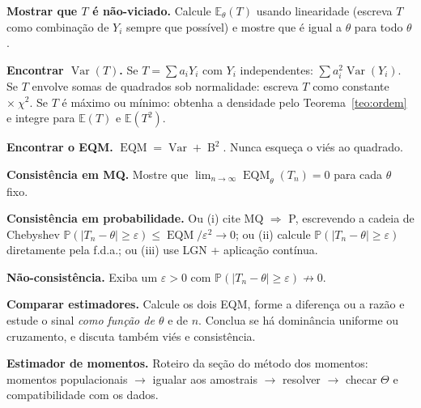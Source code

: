 \documentclass[11pt,a4paper]{article}
\theoremstyle{definition}
\theoremstyle{plain}
\newcommand{\E}{\mathbb{E}}
\newcommand{\Var}{\operatorname{Var}}
\newcommand{\EQM}{\operatorname{EQM}}
\newcommand{\B}{\operatorname{B}}
\newcommand{\Prob}{\mathbb{P}}
\begin{document}
\begin{mdframed}[linecolor=Gray,backgroundcolor=Gray!5]
\textbf{Mostrar que $T$ é não-viciado.}
Calcule $\E_\theta(T)$ usando linearidade (escreva $T$ como combinação de $Y_i$ sempre que possível) e mostre que é igual a $\theta$ para todo $\theta$.

\medskip
\textbf{Encontrar $\Var(T)$.}
Se $T=\sum a_iY_i$ com $Y_i$ independentes: $\sum a_i^2\Var(Y_i)$. Se $T$ envolve somas de quadrados sob normalidade: escreva $T$ como constante $\times\ \chi^2$. Se $T$ é máximo ou mínimo: obtenha a densidade pelo Teorema~\ref{teo:ordem} e integre para $\E(T)$ e $\E(T^2)$.

\medskip
\textbf{Encontrar o EQM.}
$\EQM=\Var+\B^2$. Nunca esqueça o viés ao quadrado.

\medskip
\textbf{Consistência em MQ.}
Mostre que $\lim_{n\to\infty}\EQM_\theta(T_n)=0$ para cada $\theta$ fixo.

\medskip
\textbf{Consistência em probabilidade.}
Ou (i) cite MQ $\Rightarrow$ P, escrevendo a cadeia de Chebyshev
$\Prob(|T_n-\theta|\ge\varepsilon)\le\EQM/\varepsilon^2\to0$;
ou (ii) calcule $\Prob(|T_n-\theta|\ge\varepsilon)$ diretamente pela f.d.a.;
ou (iii) use LGN + aplicação contínua.

\medskip
\textbf{Não-consistência.}
Exiba um $\varepsilon>0$ com $\Prob(|T_n-\theta|\ge\varepsilon)\not\to0$.

\medskip
\textbf{Comparar estimadores.}
Calcule os dois EQM, forme a diferença ou a razão e estude o sinal \emph{como função de $\theta$} e de $n$. Conclua se há dominância uniforme ou cruzamento, e discuta também viés e consistência.

\medskip
\textbf{Estimador de momentos.}
Roteiro da seção do método dos momentos: momentos populacionais $\to$ igualar aos amostrais $\to$ resolver $\to$ checar $\Theta$ e compatibilidade com os dados.
\end{mdframed}
\end{document}
